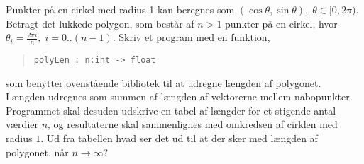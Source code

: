 Punkter på en cirkel med radius 1 kan beregnes som $(\cos \theta, \sin \theta), \;\theta\in [0,2\pi)$. Betragt det lukkede polygon, som består af $n>1$ punkter på en cirkel, hvor $\theta_i = \frac{2\pi i}{n},\; i = 0..(n-1)$.
Skriv et program med en funktion,
  \begin{quote}
    \lstinline{polyLen : n:int -> float}
  \end{quote}
  som benytter ovenstående bibliotek til at udregne længden af polygonet. Længden udregnes som summen af længden af vektorerne mellem nabopunkter. Programmet skal desuden udskrive en tabel af længder for et stigende antal værdier $n$, og resultaterne skal sammenlignes med omkredsen af cirklen med radius $1$. Ud fra tabellen hvad ser det ud til at der sker med længden af polygonet, når $n\rightarrow\infty$?
